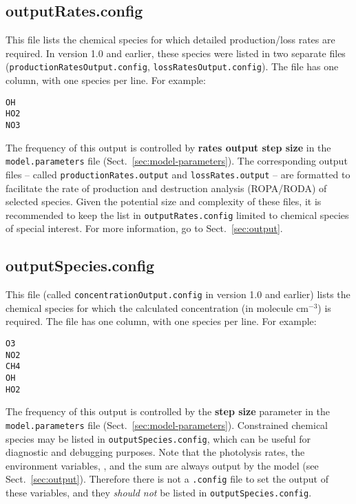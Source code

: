 \subsection{outputRates.config} \label{subsec:outputrates}

This file lists the chemical species for which detailed production/loss
rates are required. In version 1.0 and earlier, these species were
listed in two separate files (\texttt{productionRatesOutput.config},
\texttt{lossRatesOutput.config}). The file has one column, with one
species per line. For example:

\begin{verbatim}
OH
HO2
NO3
\end{verbatim}

The frequency of this output is controlled by \textbf{rates output step size}
in the \texttt{model.parameters} file (Sect.~\ref{sec:model-parameters}).
The corresponding output files -- called \texttt{productionRates.output}
and \texttt{lossRates.output} -- are formatted to facilitate the rate
of production and destruction analysis (ROPA/RODA) of selected species.
Given the potential size and complexity of these files, it is
recommended to keep the list in \texttt{outputRates.config} limited
to chemical species of special interest. For more information, go to
Sect.~\ref{sec:output}.

\subsection{outputSpecies.config} \label{subsec:outputspecies}

This file (called \texttt{concentrationOutput.config} in version 1.0
and earlier) lists the chemical species for which the calculated
concentration (in molecule cm$^{-3}$) is required. The file has one
column, with one species per line. For example:

\begin{verbatim}
O3
NO2
CH4
OH
HO2
\end{verbatim}

The frequency of this output is controlled by the \textbf{step size} parameter
in the \texttt{model.parameters} file (Sect.~\ref{sec:model-parameters}).
Constrained chemical species may be listed in \texttt{outputSpecies.config},
which can be useful for diagnostic and debugging purposes. Note that
the photolysis rates, the environment variables, , and the
 sum are always output by the model (see Sect.~\ref{sec:output}).
Therefore there is not a \texttt{.config} file to set the output of
these variables, and they \emph{should not} be listed in
\texttt{outputSpecies.config}.

